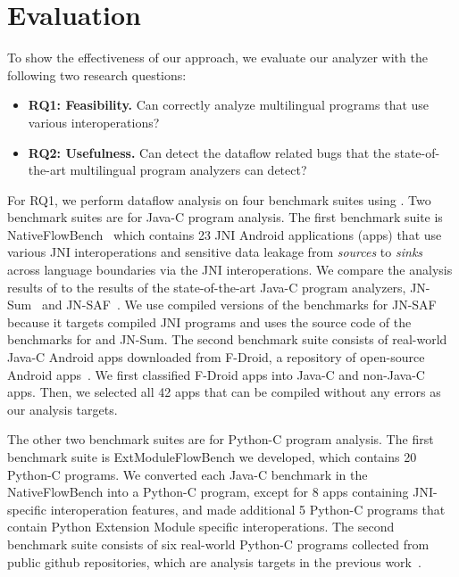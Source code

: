 \newcommand{\req}[1]{RQ#1}


\section{Evaluation}\label{sec:eval}

To show the effectiveness of our approach, we evaluate our analyzer
\ours with the following two research questions:
\begin{itemize}
  \item \textbf{\req{1}: Feasibility.} Can \ours correctly analyze multilingual
    programs that use various interoperations?

  \item \textbf{\req{2}: Usefulness.} Can \ours detect the dataflow related
    bugs that the state-of-the-art multilingual program analyzers can detect?
\end{itemize}

For \req{1}, we perform dataflow analysis on four benchmark suites using \ours.
Two benchmark suites are for Java-C program analysis. 
The first benchmark suite is NativeFlowBench~\cite{nativeflowbench, JN-SAF}
which contains 23 JNI Android applications (apps) that use various JNI
interoperations and sensitive data leakage from {\it sources} to {\it sinks}
across language boundaries via the JNI interoperations.  We compare the analysis
results of \ours to the results of the state-of-the-art Java-C program
analyzers, JN-Sum~\cite{LeeASE20} and JN-SAF~\cite{JN-SAF}. We use compiled
versions of the benchmarks for JN-SAF because it targets compiled JNI programs
and uses the source code of the benchmarks for \ours and JN-Sum.  The second
benchmark suite consists of real-world Java-C Android apps downloaded from
F-Droid, a repository of open-source Android apps~\cite{fdroid}.  We first
classified F-Droid apps into Java-C and non-Java-C apps. Then, we selected all 42
apps that can be compiled without any errors as our analysis targets.

The other two benchmark suites are for Python-C program analysis.  
The first benchmark suite is ExtModuleFlowBench we developed, which contains 20
Python-C programs.
We converted each Java-C benchmark in the NativeFlowBench into a Python-C
program, except for 8 apps containing JNI-specific interoperation
features, and made additional 5 Python-C programs that contain Python
Extension Module specific interoperations.
The second benchmark suite consists of six real-world Python-C programs
collected from public github repositories, which are analysis targets in the
previous work~\cite{cpython}.

